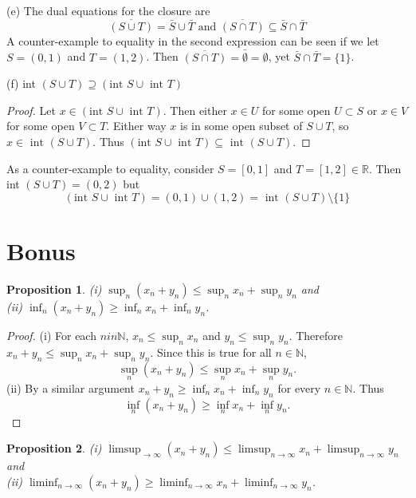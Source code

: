 \documentclass[11pt]{amsart}
\newtheorem*{prop}{Proposition}
\begin{document}
(e) The dual equations for the closure are 
\[ \overline{(S\cup T)} = \bar{S} \cup \bar{T} \text{  and  } \overline{(S\cap T)} \subseteq \bar{S} \cap \bar{T} \]
A counter-example to equality in the second expression can be seen if we let $S = (0,1)$ and $T = (1,2)$. Then $\overline{(S\cap T)} = \bar{\emptyset} = \emptyset$, yet $\bar{S} \cap \bar{T} = \{1\}$.

(f) int $(S\cup T) \supseteq (\text{int }S\cup \text{ int }T)$
\begin{proof}
  Let $x \in (\text{int } S \cup \text{ int }T)$. Then either $x \in U$ for some open $U \subset S$ or $x\in V$ for some open $V\subset T$. Either way $x$ is in some open subset of $S\cup T$, so $x\in \text{ int }(S\cup T)$. Thus $(\text{int }S\cup \text{ int }T) \subseteq \text{ int }(S\cup T)$.
\end{proof}

As a counter-example to equality, consider $S = [0,1]$ and $T = [1,2] \in \mathbb{R}$. Then int $(S\cup T) = (0,2)$ but
\[ (\text{int }S\cup \text{ int }T) = (0,1)\cup (1,2) = \text{ int }(S\cup T)\setminus \{1\} \]




\section*{Bonus}

\begin{prop}
  (i) $\sup_{n}(x_{n} + y_{n}) \leq \sup_{n}x_{n} + \sup_{n}y_{n}$ and \\
  (ii) $\inf_{n}(x_{n} + y_{n}) \geq \inf_{n}x_{n} + \inf_{n}y_{n}$.
\end{prop}

\begin{proof}
  (i) For each $n in \mathbb{N}$, $x_{n} \leq \sup_{n}x_{n}$ and $y_{n} \leq \sup_{n}y_{n}$. Therefore $x_{n} + y_{n} \leq \sup_{n}x_{n} + \sup_{n}y_{n}$. Since this is true for all $n \in \mathbb{N}$,
  \[ \sup_{n}(x_{n} + y_{n}) \leq \sup_{n}x_{n} + \sup_{n}y_{n}. \]
  (ii) By a similar argument $x_{n} + y_{n} \geq \inf_{n}x_{n} + \inf_{n}y_{n}$ for every $n\in\mathbb{N}$. Thus 
  \[ \inf_{n}(x_{n} + y_{n}) \geq \inf_{n}x_{n} + \inf_{n}y_{n}.\]
\end{proof}

\begin{prop}
  (i) $\limsup_{\rightarrow\infty}(x_{n} + y_{n}) \leq \limsup_{n\rightarrow\infty}x_{n} + \limsup_{n\rightarrow\infty}y_{n}$ and \\
  (ii) $\liminf_{n\rightarrow\infty}(x_{n} + y_{n}) \geq \liminf_{n\rightarrow\infty}x_{n} + \liminf_{n\rightarrow\infty}y_{n}$.
\end{prop}
\end{document}
